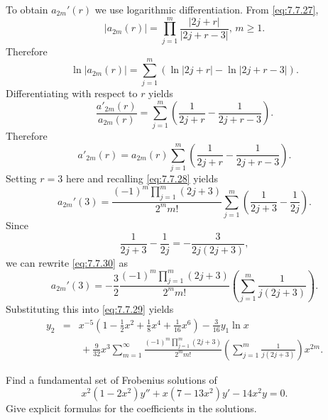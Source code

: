 \begin{examplesolution}
To obtain $a_{2m}'(r)$ we use logarithmic differentiation. From \eqref{eq:7.7.27},
\[
  |a_{2m}(r)|=\prod_{j=1}^{m}\frac{|2j+r|}{|2j+r-3|},\,m\ge1.
\]
Therefore
\[
  \ln|a_{2m}(r)|=\sum^{m}_{j=1}\left(\ln|2j+r|-\ln|2j+r-3|\right).
\]
Differentiating with respect to $r$ yields
\[
  \frac{a'_{2m}(r)}{a_{2m}(r)}=\sum^{m}_{j=1}\left(\frac{1}{2j+r}-\frac{1}{2j+r-3}\right).
\]
Therefore
\[
  a'_{2m}(r)=a_{2m}(r)\sum^{m}_{j=1}\left(\frac{1}{2j+r}-\frac{1}{2j+r-3}\right).
\]
Setting $r=3$ here and recalling \eqref{eq:7.7.28} yields
\begin{equation}
  \label{eq:7.7.30}a_{2m}'(3)=\frac{(-1)^{m}\prod_{j=1}^{m}(2j+3)}{2^{m}m!}\sum_{j=1}^{m}\left(\frac{1}{2j+3}-\frac{1}{2j}\right).
\end{equation}
Since
\[
  \frac{1}{2j+3}-\frac{1}{2j}=-\frac{3}{2j(2j+3)},
\]
we can rewrite \eqref{eq:7.7.30} as
\[
  a_{2m}'(3)=-\frac{3}{2}\frac{(-1)^{m}\prod_{j=1}^{m}(2j+3)}{2^{m}m!}\left(\sum_{j=1}^{m}\frac{1}{j(2j+3)}\right).
\]
Substituting this into \eqref{eq:7.7.29} yields
\begin{eqnarray*}
  y_{2} & = & x^{-5}\left(1-\frac{1}{2}x^{2}+\frac{1}{8}x^{4}+\frac{1}{16}x^{6}\right)-\frac{3}{16}y_{1}\ln x \\[10pt]
        &   & \,+\frac{9}{32}x^{3}\sum_{m=1}^{\infty}\frac{(-1)^{m}\prod_{j=1}^{m}(2j+3)}{2^{m}m!}\left(\sum_{j=1}^{m}\frac{1}{j(2j+3)}\right)x^{2m}.
\end{eqnarray*}
\end{examplesolution}

\begin{example}
  \label{example:7.7.4} \rm Find a fundamental set of Frobenius solutions of
  \[
    x^{2}(1-2x^{2})y''+x(7-13x^{2})y'-14x^{2}y=0.
  \]
  Give explicit formulas for the coefficients in the solutions.
\end{example}

